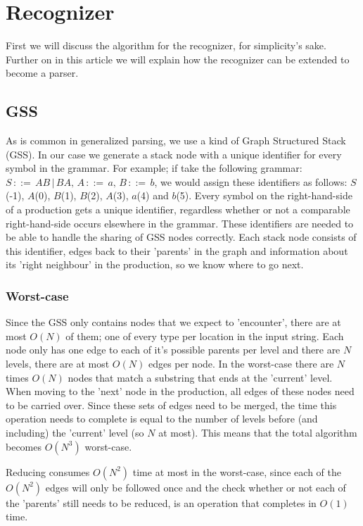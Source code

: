 \documentclass[a4paper,10pt]{article}
\begin{document}
\section{Recognizer}

First we will discuss the algorithm for the recognizer, for simplicity's sake. Further on in this article we will explain how the recognizer can be extended to become a parser.

\subsection{GSS}

As is common in generalized parsing, we use a kind of Graph Structured Stack (GSS). In our case we generate a stack node with a unique identifier for every symbol in the grammar. For example; if take the following grammar: $S\,::=\,AB\,|\,BA,\,A\,::=\,a,\,B\,::=\,b$, we would assign these identifiers as follows: $S$(-1), $A$(0), $B$(1), $B$(2), $A$(3), $a$(4) and $b$(5). Every symbol on the right-hand-side of a production gets a unique identifier, regardless whether or not a comparable right-hand-side occurs elsewhere in the grammar. These identifiers are needed to be able to handle the sharing of GSS nodes correctly. Each stack node consists of this identifier, edges back to their 'parents' in the graph and information about its 'right neighbour' in the production, so we know where to go next.

\subsubsection{Worst-case}
Since the GSS only contains nodes that we expect to 'encounter', there are at most $O(N)$ of them; one of every type per location in the input string. Each node only has one edge to each of it's possible parents per level and there are $N$ levels, there are at most $O(N)$ edges per node. In the worst-case there are $N$ times $O(N)$ nodes that match a substring that ends at the 'current' level. When moving to the 'next' node in the production, all edges of these nodes need to be carried over. Since these sets of edges need to be merged, the time this operation needs to complete is equal to the number of levels before (and including) the 'current' level (so $N$ at most). This means that the total algorithm becomes $O(N^3)$ worst-case.

Reducing consumes $O(N^2)$ time at most in the worst-case, since each of the $O(N^2)$ edges will only be followed once and the check whether or not each of the 'parents' still needs to be reduced, is an operation that completes in $O(1)$ time.
\end{document}
